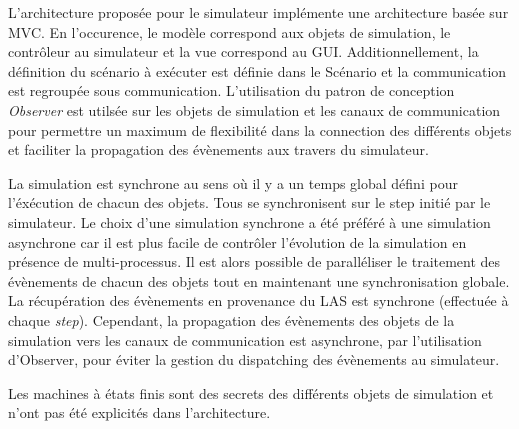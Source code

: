 

L'architecture proposée pour le simulateur implémente une architecture basée sur MVC.  En l'occurence, le modèle correspond aux objets de simulation, le contrôleur au simulateur et la vue correspond au GUI.  Additionnellement, la définition du scénario à exécuter est définie dans le Scénario et la communication est regroupée sous communication.  L'utilisation du patron de conception \textit{Observer} est utilsée sur les objets de simulation et les canaux de communication pour permettre un maximum de flexibilité dans la connection des différents objets et faciliter la propagation des évènements aux travers du simulateur.

La simulation est synchrone au sens où il y a un temps global défini pour l'éxécution de chacun des objets.  Tous se synchronisent sur le step initié par le simulateur.  Le choix d'une simulation synchrone a été préféré à une simulation asynchrone car il est plus facile de contrôler l'évolution de la simulation en présence de multi-processus.  Il est alors possible de paralléliser le traitement des évènements de chacun des objets tout en maintenant une synchronisation globale.  La récupération des évènements en provenance du LAS est synchrone (effectuée à chaque \textit{step}).  Cependant, la propagation des évènements des objets de la simulation vers les canaux de communication est asynchrone, par l'utilisation d'Observer, pour éviter la gestion du dispatching des évènements au simulateur.

Les machines à états finis sont des secrets des différents objets de simulation et n'ont pas été explicités dans l'architecture.